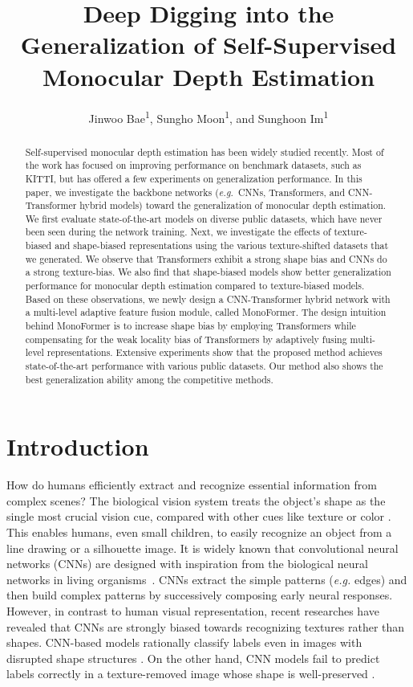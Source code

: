 \documentclass[letterpaper]{article} \usepackage{aaai23}  \usepackage{times}  \usepackage{helvet}  \usepackage{courier}  \usepackage[hyphens]{url}  \usepackage{graphicx} \urlstyle{rm} \def\UrlFont{\rm}  \usepackage{natbib}  \usepackage{caption} \frenchspacing  \setlength{\pdfpagewidth}{8.5in} \setlength{\pdfpageheight}{11in} \usepackage{algorithm}
\title{Deep Digging into the Generalization of Self-Supervised Monocular Depth Estimation}
\author{
Jinwoo Bae\textsuperscript{\rm 1}, Sungho Moon\textsuperscript{\rm 1}, and Sunghoon Im\textsuperscript{\rm 1}\\
}
\newcommand{\eg}{\textit{e.g.}}
\begin{document}
\maketitle

\begin{abstract}
Self-supervised monocular depth estimation has been widely studied recently. Most of the work has focused on improving performance on benchmark datasets, such as KITTI, but has offered a few experiments on generalization performance.
In this paper, we investigate the backbone networks (\eg~CNNs, Transformers, and CNN-Transformer hybrid models) toward the generalization of monocular depth estimation.
We first evaluate state-of-the-art models on diverse public datasets, which have never been seen during the network training.
Next, we investigate the effects of texture-biased and shape-biased representations using the various texture-shifted datasets that we generated.
We observe that Transformers exhibit a strong shape bias and CNNs do a strong texture-bias.
We also find that shape-biased models show better generalization performance for monocular depth estimation compared to texture-biased models. 
Based on these observations, we newly design a CNN-Transformer hybrid network with a multi-level adaptive feature fusion module, called MonoFormer.
The design intuition behind MonoFormer is to increase shape bias by employing Transformers while compensating for the weak locality bias of Transformers by adaptively fusing multi-level representations.
Extensive experiments show that the proposed method achieves state-of-the-art performance with various public datasets. Our method also shows the best generalization ability among the competitive methods.
\end{abstract}


\section{Introduction}

How do humans efficiently extract and recognize essential information from complex scenes? The biological vision system treats the object's shape as the single most crucial vision cue, compared with other cues like texture or color \cite{landau1988importance}. This enables humans, even small children, to easily recognize an object from a line drawing or a silhouette image.
It is widely known that convolutional neural networks (CNNs) are designed with inspiration from the biological neural networks in living organisms~\cite{hubel1959receptive,fukushima1988neocognitron,kriegeskorte2015deep}. 
CNNs extract the simple patterns (\textit{e.g.} edges) and then build complex patterns by successively composing early neural responses.
However, in contrast to human visual representation, recent researches \cite{geirhos2018imagenet,morrison2021exploring,tuli2021convolutional} have revealed that CNNs are strongly biased towards recognizing textures rather than shapes.
CNN-based models rationally classify labels even in images with disrupted shape structures \cite{gatys2017texture,brendel2019approximating}. On the other hand, CNN models fail to predict labels correctly in a texture-removed image whose shape is well-preserved \cite{ballester2016performance}.
\end{document}

